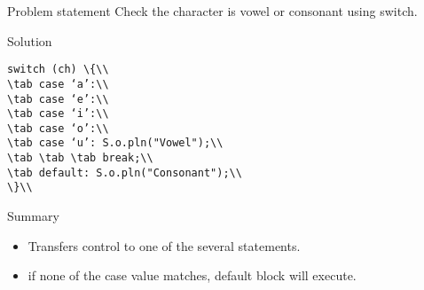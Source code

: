 \documentclass[aspectratio=169,14pt,usenames,dvipsnames]{beamer}
\newcommand\tab[1][1cm]{\hspace*{#1}}
\begin{document}
\begin{frame}{Problem statement}
Check the character is vowel or consonant
using switch.
\end{frame}

\begin{frame}{Solution}
\begin{lstlisting}
switch (ch) \{\\
\tab case ‘a’:\\
\tab case ‘e’:\\
\tab case ‘i’:\\
\tab case ‘o’:\\
\tab case ‘u’: S.o.pln("Vowel");\\
\tab \tab \tab break;\\
\tab default: S.o.pln("Consonant");\\
\}\\
\end{lstlisting}
\end{frame}


\begin{frame}{Summary}
\begin{itemize}
    \item Transfers control to one of the several
statements.
\item if none of the case value matches, default
block will execute.
\end{itemize}
\end{frame}
\end{document}
